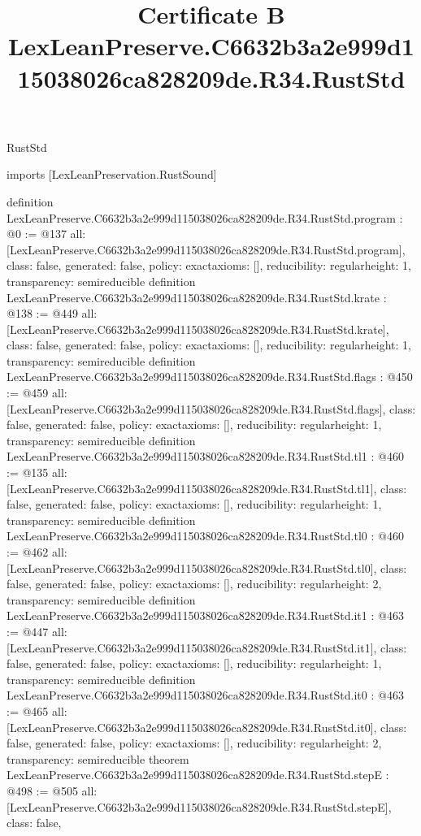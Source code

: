 \begin{lexlean}{RustStd}
\title{Certificate B LexLeanPreserve.C6632b3a2e999d115038026ca828209de.R34.RustStd}
\begin{coremodule}
imports [LexLeanPreservation.RustSound]

definition LexLeanPreserve.C6632b3a2e999d115038026ca828209de.R34.RustStd.program : @0 := @137 {
  all: [LexLeanPreserve.C6632b3a2e999d115038026ca828209de.R34.RustStd.program],
  class: false,
  generated: false,
  policy: exact{axioms: []},
  reducibility: regular{height: 1},
  transparency: semireducible
}
definition LexLeanPreserve.C6632b3a2e999d115038026ca828209de.R34.RustStd.krate : @138 := @449 {
  all: [LexLeanPreserve.C6632b3a2e999d115038026ca828209de.R34.RustStd.krate],
  class: false,
  generated: false,
  policy: exact{axioms: []},
  reducibility: regular{height: 1},
  transparency: semireducible
}
definition LexLeanPreserve.C6632b3a2e999d115038026ca828209de.R34.RustStd.flags : @450 := @459 {
  all: [LexLeanPreserve.C6632b3a2e999d115038026ca828209de.R34.RustStd.flags],
  class: false,
  generated: false,
  policy: exact{axioms: []},
  reducibility: regular{height: 1},
  transparency: semireducible
}
definition LexLeanPreserve.C6632b3a2e999d115038026ca828209de.R34.RustStd.tl1 : @460 := @135 {
  all: [LexLeanPreserve.C6632b3a2e999d115038026ca828209de.R34.RustStd.tl1],
  class: false,
  generated: false,
  policy: exact{axioms: []},
  reducibility: regular{height: 1},
  transparency: semireducible
}
definition LexLeanPreserve.C6632b3a2e999d115038026ca828209de.R34.RustStd.tl0 : @460 := @462 {
  all: [LexLeanPreserve.C6632b3a2e999d115038026ca828209de.R34.RustStd.tl0],
  class: false,
  generated: false,
  policy: exact{axioms: []},
  reducibility: regular{height: 2},
  transparency: semireducible
}
definition LexLeanPreserve.C6632b3a2e999d115038026ca828209de.R34.RustStd.it1 : @463 := @447 {
  all: [LexLeanPreserve.C6632b3a2e999d115038026ca828209de.R34.RustStd.it1],
  class: false,
  generated: false,
  policy: exact{axioms: []},
  reducibility: regular{height: 1},
  transparency: semireducible
}
definition LexLeanPreserve.C6632b3a2e999d115038026ca828209de.R34.RustStd.it0 : @463 := @465 {
  all: [LexLeanPreserve.C6632b3a2e999d115038026ca828209de.R34.RustStd.it0],
  class: false,
  generated: false,
  policy: exact{axioms: []},
  reducibility: regular{height: 2},
  transparency: semireducible
}
theorem LexLeanPreserve.C6632b3a2e999d115038026ca828209de.R34.RustStd.stepE : @498 := @505 {
  all: [LexLeanPreserve.C6632b3a2e999d115038026ca828209de.R34.RustStd.stepE],
  class: false,
}
\end{coremodule}
\end{lexlean}
